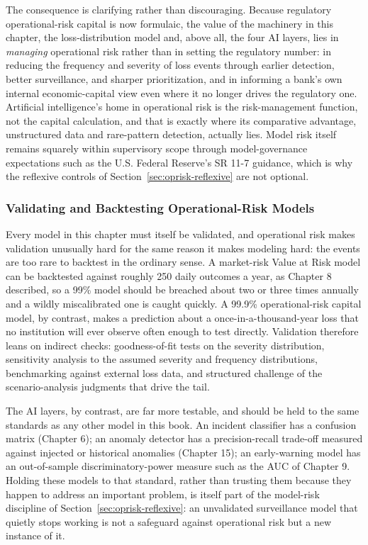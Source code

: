 \documentclass[../ai_in_finance]{subfiles}
\begin{document}
The consequence is clarifying rather than discouraging. Because regulatory operational-risk capital is now formulaic, the value of the machinery in this chapter, the loss-distribution model and, above all, the four AI layers, lies in \emph{managing} operational risk rather than in setting the regulatory number: in reducing the frequency and severity of loss events through earlier detection, better surveillance, and sharper prioritization, and in informing a bank's own internal economic-capital view even where it no longer drives the regulatory one. Artificial intelligence's home in operational risk is the risk-management function, not the capital calculation, and that is exactly where its comparative advantage, unstructured data and rare-pattern detection, actually lies. Model risk itself remains squarely within supervisory scope through model-governance expectations such as the U.S. Federal Reserve's SR 11-7 guidance, which is why the reflexive controls of Section~\ref{sec:oprisk-reflexive} are not optional.

\subsubsection*{Validating and Backtesting Operational-Risk Models}
\label{sec:oprisk-validation}

Every model in this chapter must itself be validated, and operational risk makes validation unusually hard for the same reason it makes modeling hard: the events are too rare to backtest in the ordinary sense. A market-risk Value at Risk model can be backtested against roughly 250 daily outcomes a year, as Chapter 8 described, so a 99\% model should be breached about two or three times annually and a wildly miscalibrated one is caught quickly. A 99.9\% operational-risk capital model, by contrast, makes a prediction about a once-in-a-thousand-year loss that no institution will ever observe often enough to test directly. Validation therefore leans on indirect checks: goodness-of-fit tests on the severity distribution, sensitivity analysis to the assumed severity and frequency distributions, benchmarking against external loss data, and structured challenge of the scenario-analysis judgments that drive the tail.

The AI layers, by contrast, are far more testable, and should be held to the same standards as any other model in this book. An incident classifier has a confusion matrix (Chapter 6); an anomaly detector has a precision-recall trade-off measured against injected or historical anomalies (Chapter 15); an early-warning model has an out-of-sample discriminatory-power measure such as the AUC of Chapter 9. Holding these models to that standard, rather than trusting them because they happen to address an important problem, is itself part of the model-risk discipline of Section~\ref{sec:oprisk-reflexive}: an unvalidated surveillance model that quietly stops working is not a safeguard against operational risk but a new instance of it.
\end{document}
